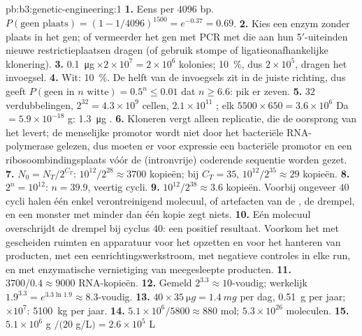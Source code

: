 \begin{solution}{pb:b3:genetic-engineering:1}
\textbf{1.} Eens per $4096$ bp. $P(\text{geen plaats}) = (1 - 1/4096)^{1500}
= e^{-0.37} = 0.69$.
\textbf{2.} Kies een enzym zonder plaats in het gen; of vermeerder het
gen met PCR met  die aan hun 5$'$-uiteinden nieuwe
restrictieplaatsen dragen (of gebruik stompe of ligatieonafhankelijke
klonering).
\textbf{3.} \qty{0.1}{\micro g}\,$\times 2\times 10^{7} = 2\times
10^{6}$ kolonies; \qty{10}{\%}, dus $2\times 10^{5}$, dragen het
invoegsel.
\textbf{4.} Wit: \qty{10}{\%}. De helft van de invoegsels zit in de
juiste richting, dus geeft $P(\text{geen in } n \text{ witte}) = 0.5^{n} \le 0.01$
dat $n \ge 6.6$: pik er zeven.
\textbf{5.} $32$ verdubbelingen, $2^{32} = 4.3\times 10^{9}$ cellen,
$2.1\times
10^{11}$ ; elk $5500\times 650 = 3.6\times 10^{6}$ Da $=
5.9\times 10^{-18}$ g: \qty{1.3}{\micro g} .
\textbf{6.} Kloneren vergt alleen replicatie, die de oorsprong van het
 levert; de menselijke promotor wordt niet door het bacteriële
RNA-polymerase gelezen, dus moeten er voor expressie een bacteriële
promotor en een ribosoombindingsplaats vóór de (intronvrije) coderende
sequentie worden gezet.
\textbf{7.} $N_{0} = N_{T}/2^{C_{T}}$: $10^{12}/2^{28} \approx 3700$
kopieën; bij $C_{T} = 35$, $10^{12}/2^{35} \approx 29$ kopieën.
\textbf{8.} $2^{n} = 10^{12}$: $n = 39.9$, veertig cycli.
\textbf{9.} $10^{12}/2^{38} \approx 3.6$ kopieën. Voorbij ongeveer $40$
cycli halen één enkel verontreinigend molecuul, of artefacten van de
, de drempel, en een monster met minder dan één kopie zegt niets.
\textbf{10.} Eén molecuul overschrijdt de drempel bij cyclus $40$: een
positief resultaat. Voorkom het met gescheiden ruimten en apparatuur
voor het opzetten en voor het hanteren van producten, met een
eenrichtingswerkstroom, met negatieve controles in elke run, en met
enzymatische vernietiging van meegesleepte producten.
\textbf{11.} $3700/0.4 \approx 9000$ RNA-kopieën.
\textbf{12.} Gemeld $2^{3.3} \approx 10$-voudig; werkelijk $1.9^{3.3} =
e^{3.3\ln 1.9} \approx 8.3$-voudig.
\textbf{13.} $40\times \qty{35}{\micro g} = \qty{1.4}{mg}$ per dag,
\qty{0.51}{g} per jaar; $\times 10^{7}$: \qty{5100}{kg} per jaar.
\textbf{14.} $5.1\times 10^{6}/5800 \approx 880$ mol; $5.3\times 10^{26}$
moleculen.
\textbf{15.} $5.1\times 10^{6}$ g $/ (20$ g/L$) = 2.6\times 10^{5}$ L

\end{solution}
